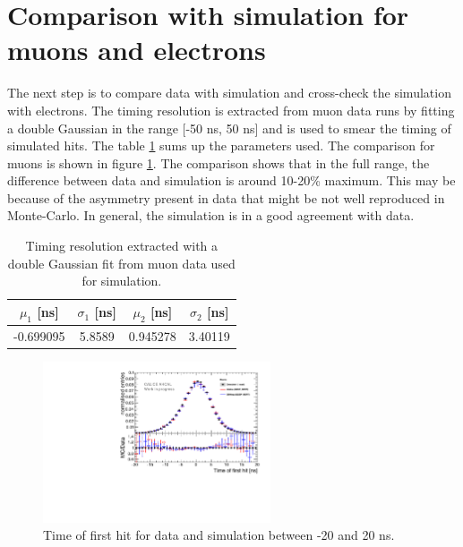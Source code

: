 \documentclass[twoside,a4paper,11pt]{article}
\begin{document}
\section{Comparison with simulation for muons and electrons}

The next step is to compare data with simulation and cross-check the simulation with electrons. The timing resolution is extracted from muon data runs by fitting a double Gaussian in the range [-50 ns, 50 ns] and is used to smear the timing of simulated hits. The table \ref{table:time_res_sim} sums up the parameters used. The comparison for muons is shown in figure \ref{fig:sim_data_muon}. The comparison shows that in the full range, the difference between data and simulation is around 10-20\% maximum. This may be because of the asymmetry present in data that might be not well reproduced in Monte-Carlo. In general, the simulation is in a good agreement with data.

\begin{table}[htbp]
\centering
  \begin{tabular}{@{} cccc @{}}
    \hline
    $\mu_{1}$ [ns] & $\sigma_{1}$ [ns] & $\mu_{2}$ [ns] & $\sigma_{2}$ [ns] \\ 
    \hline
    -0.699095 & 5.8589 & 0.945278 & 3.40119 \\
    \hline
  \end{tabular}
  \caption[Timing resolution extracted with a double Gaussian fit from muon data used for simulation.]{Timing resolution extracted with a double Gaussian fit from muon data used for simulation.\footnotemark[1]}
  \label{table:time_res_sim}
\end{table}

\begin{figure}[htbp]
	\centering
	\includegraphics[width=0.6\textwidth]{fig/Muons/Comparison_MokkaDD4hepData_Muons.pdf}
	\caption{Time of first hit for data and simulation between -20 and 20 ns.}
	\label{fig:sim_data_muon}
\end{figure}
\end{document}
